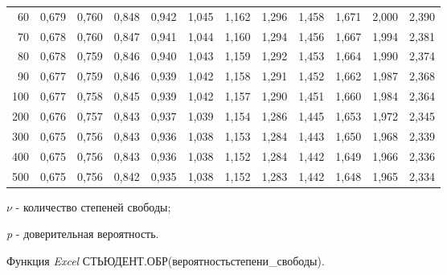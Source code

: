 \documentclass[12pt,a4paper]{article}
\begin{document}
\begin{table}[htbp]
\begin{tabular}{rrrrrrrrrrrr}
    60    & 0,679 & 0,760 & 0,848 & 0,942 & 1,045 & 1,162 & 1,296 & 1,458 & 1,671 & 2,000 & 2,390 \\
    70    & 0,678 & 0,760 & 0,847 & 0,941 & 1,044 & 1,160 & 1,294 & 1,456 & 1,667 & 1,994 & 2,381 \\
    80    & 0,678 & 0,759 & 0,846 & 0,940 & 1,043 & 1,159 & 1,292 & 1,453 & 1,664 & 1,990 & 2,374 \\
    90    & 0,677 & 0,759 & 0,846 & 0,939 & 1,042 & 1,158 & 1,291 & 1,452 & 1,662 & 1,987 & 2,368 \\
    100   & 0,677 & 0,758 & 0,845 & 0,939 & 1,042 & 1,157 & 1,290 & 1,451 & 1,660 & 1,984 & 2,364 \\
    200   & 0,676 & 0,757 & 0,843 & 0,937 & 1,039 & 1,154 & 1,286 & 1,445 & 1,653 & 1,972 & 2,345 \\
    300   & 0,675 & 0,756 & 0,843 & 0,936 & 1,038 & 1,153 & 1,284 & 1,443 & 1,650 & 1,968 & 2,339 \\
    400   & 0,675 & 0,756 & 0,843 & 0,936 & 1,038 & 1,152 & 1,284 & 1,442 & 1,649 & 1,966 & 2,336 \\
    500   & 0,675 & 0,756 & 0,842 & 0,935 & 1,038 & 1,152 & 1,283 & 1,442 & 1,648 & 1,965 & 2,334 \\
    \bottomrule
    \end{tabular}%
  \label{tab:addlabel}%
\end{table}%


\textit{$\nu$} - количество степеней свободы;

\textit{p} - доверительная вероятность.

Функция \textit{Excel} СТЬЮДЕНТ.ОБР(вероятность\;степени\_свободы).
\pagebreak
\end{document}
